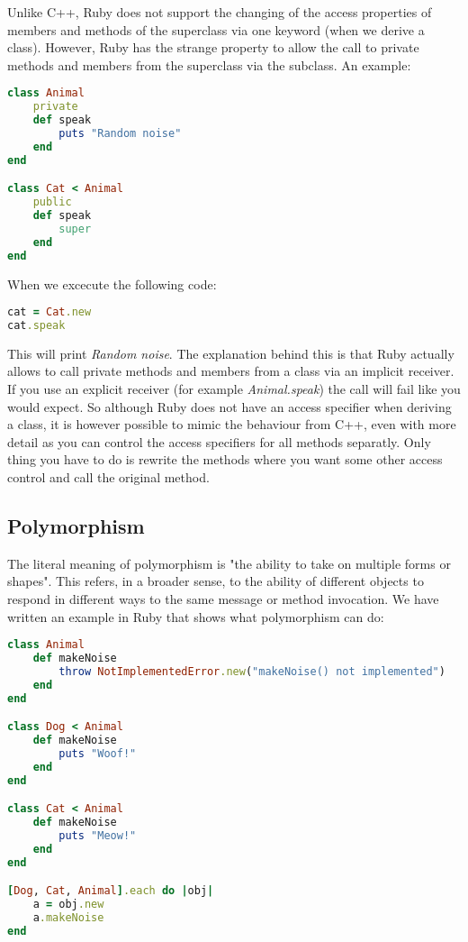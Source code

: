 \documentclass[10pt,a4paper,twocolumn]{article}
\begin{document}
Unlike C++, Ruby does not support the changing of the access properties of members and methods of the superclass via one keyword (when we derive a class). However, Ruby has the strange property to allow the call to private methods and members from the superclass via the subclass. An example:

\begin{lstlisting}[language=Ruby]
class Animal
	private
	def speak
		puts "Random noise"
	end
end

class Cat < Animal
	public
	def speak
		super
	end
end
\end{lstlisting}

When we excecute the following code:

\begin{lstlisting}[language=Ruby]
cat = Cat.new
cat.speak
\end{lstlisting}

This will print \textit{Random noise}. The explanation behind this is that Ruby actually allows to call private methods and members from a class via an implicit receiver. If you use an explicit receiver (for example \textit{Animal.speak}) the call will fail like you would expect. So although Ruby does not have an access specifier when deriving a class, it is however possible to mimic the behaviour from C++, even with more detail as you can control the access specifiers for all methods separatly. Only thing you have to do is rewrite the methods where you want some other access control and call the original method.

\subsection{Polymorphism}
The literal meaning of polymorphism is "the ability to take on multiple forms or shapes". This refers, in a broader sense, to the ability of different objects to respond in different ways to the same message or method invocation. We have written an example in Ruby that shows what polymorphism can do:

\begin{lstlisting}[language=Ruby]
class Animal
	def makeNoise
		throw NotImplementedError.new("makeNoise() not implemented")
	end
end

class Dog < Animal
	def makeNoise
		puts "Woof!"
	end
end

class Cat < Animal
	def makeNoise
		puts "Meow!"
	end
end

[Dog, Cat, Animal].each do |obj|
	a = obj.new
	a.makeNoise
end
\end{lstlisting}
\end{document}
